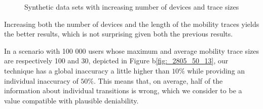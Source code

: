\begin{figure}[htb]
\hspace*{-0.7em}
\hspace*{-0.7em}
\caption{Synthetic data sets with increasing number of devices and
  trace sizes}
\label{fig:perf_results_sim_devices_traces}
\end{figure}

Increasing both the number of devices and the length of the mobility
traces yields the better results, which is not surprising given both
the previous results.

In a scenario with 100 000 users whose maximum and average mobility
trace sizes are respectively 100 and 30, depicted in Figure
b\ref{fig:_2805_50_13}, our technique has a global inaccuracy a
little higher than $10\%$ while providing an individual inaccuracy of
$50\%$.  This means that, on average, half of the information about
individual transitions is wrong, which we consider to be a value
compatible with plausible deniability.

